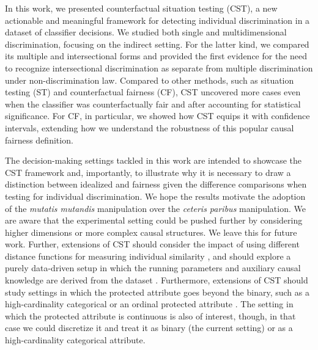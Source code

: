 %
In this work, we presented counterfactual situation testing (CST), a new actionable and meaningful framework for detecting individual discrimination in a dataset of classifier decisions.
We studied both single and multidimensional discrimination, focusing on the indirect setting.
For the latter kind, we compared its multiple and intersectional forms and provided the first evidence for the need to recognize intersectional discrimination as separate from multiple discrimination under non-discrimination law.
Compared to other methods, such as situation testing (ST) and counterfactual fairness (CF), CST uncovered more cases even when the classifier was counterfactually fair and after accounting for statistical significance.
For CF, in particular, we showed how CST equips it with confidence intervals, extending how we understand the robustness of this popular causal fairness definition. 

The decision-making settings tackled in this work are intended to showcase the CST framework and, importantly, to illustrate why it is necessary to draw a distinction between idealized and fairness given the difference comparisons when testing for individual discrimination. 
We hope the results motivate the adoption of the \textit{mutatis mutandis} manipulation over the \textit{ceteris paribus} manipulation.
We are aware that the experimental setting could be pushed further by considering higher dimensions or more complex causal structures. 
We leave this for future work.
%
Further,
extensions of CST should consider the impact of using different distance functions for measuring individual similarity \parencite{WilsonM97_HeteroDistanceFunctions}, and should explore a purely data-driven setup in which the running parameters and auxiliary causal knowledge are derived from the dataset \parencite{Cohen2013StatisticalPower, Peters2017_CausalInference}.
%
Furthermore,
extensions of CST should study settings in which the protected attribute goes beyond the binary, such as a high-cardinality categorical or an ordinal protected attribute \parencite{DBLP:journals/tkde/CerdaV22}. 
The setting in which the protected attribute is continuous is also of interest, though, in that case we could discretize it \parencite{DBLP:journals/tkde/GarciaLSLH13} and treat it as binary (the current setting) or as a high-cardinality categorical attribute.


